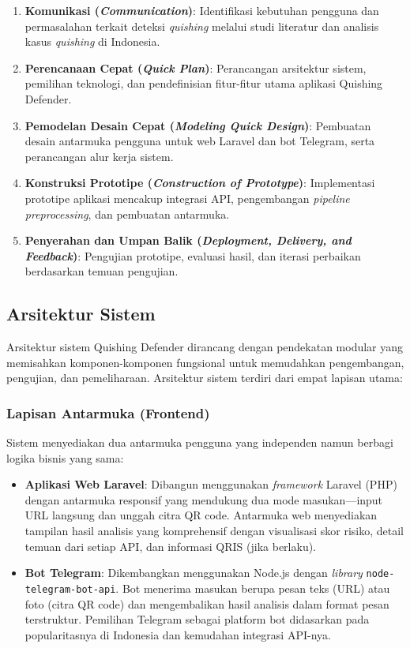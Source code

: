 \documentclass[conference]{IEEEtran}
\begin{document}
\begin{enumerate}[label=\arabic*)]
    \item \textbf{Komunikasi (\textit{Communication})}: Identifikasi kebutuhan pengguna dan permasalahan terkait deteksi \textit{quishing} melalui studi literatur dan analisis kasus \textit{quishing} di Indonesia.
    
    \item \textbf{Perencanaan Cepat (\textit{Quick Plan})}: Perancangan arsitektur sistem, pemilihan teknologi, dan pendefinisian fitur-fitur utama aplikasi Quishing Defender.
    
    \item \textbf{Pemodelan Desain Cepat (\textit{Modeling Quick Design})}: Pembuatan desain antarmuka pengguna untuk web Laravel dan bot Telegram, serta perancangan alur kerja sistem.
    
    \item \textbf{Konstruksi Prototipe (\textit{Construction of Prototype})}: Implementasi prototipe aplikasi mencakup integrasi API, pengembangan \textit{pipeline preprocessing}, dan pembuatan antarmuka.
    
    \item \textbf{Penyerahan dan Umpan Balik (\textit{Deployment, Delivery, and Feedback})}: Pengujian prototipe, evaluasi hasil, dan iterasi perbaikan berdasarkan temuan pengujian.
\end{enumerate}

\subsection{Arsitektur Sistem}

Arsitektur sistem Quishing Defender dirancang dengan pendekatan modular yang memisahkan komponen-komponen fungsional untuk memudahkan pengembangan, pengujian, dan pemeliharaan. Arsitektur sistem terdiri dari empat lapisan utama:

\subsubsection{Lapisan Antarmuka (Frontend)}
Sistem menyediakan dua antarmuka pengguna yang independen namun berbagi logika bisnis yang sama:

\begin{itemize}
    \item \textbf{Aplikasi Web Laravel}: Dibangun menggunakan \textit{framework} Laravel (PHP) dengan antarmuka responsif yang mendukung dua mode masukan---input URL langsung dan unggah citra QR code. Antarmuka web menyediakan tampilan hasil analisis yang komprehensif dengan visualisasi skor risiko, detail temuan dari setiap API, dan informasi QRIS (jika berlaku).
    
    \item \textbf{Bot Telegram}: Dikembangkan menggunakan Node.js dengan \textit{library} \texttt{node-telegram-bot-api}. Bot menerima masukan berupa pesan teks (URL) atau foto (citra QR code) dan mengembalikan hasil analisis dalam format pesan terstruktur. Pemilihan Telegram sebagai platform bot didasarkan pada popularitasnya di Indonesia dan kemudahan integrasi API-nya.
\end{itemize}
\end{document}
